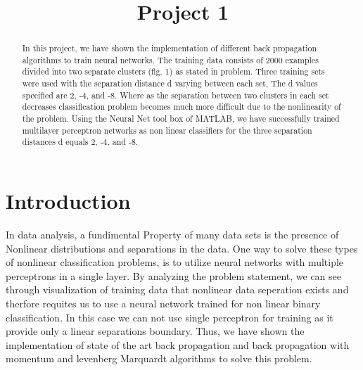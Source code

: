\documentclass[conference]{IEEEtran}
\begin{document}
\title{Project 1}
\normalsize
\author{
	\and
{}
\and	
{}
	
	
}


\maketitle


\begin{abstract}
 In this project, we have shown the implementation of  different back propagation algorithms to train neural networks. The training data consists of 2000 examples divided into two separate clusters (fig. 1) as stated in problem. Three training sets were used with the separation distance d varying between each set, The d values specified are 2, -4, and -8. Where as the separation between two clusters in each set decreases classification problem becomes much more difficult due to the nonlinearity of the problem. Using the Neural Net tool box of MATLAB, we have successfully trained multilayer perceptron networks as non linear classifiers for the three separation distances d equals 2, -4, and -8.
\end{abstract}


\section{Introduction}

In data analysis, a fundimental Property of many data sets is the presence of Nonlinear distributions and separations in the data. One way to solve these types of nonlinear classification problems\cite{ol}, is to utilize neural networks with multiple perceptrons in a single layer. By analyzing the problem statement, we can see through visualization of training data that nonlinear data seperation exists and therfore requites us to use a neural network trained for non linear binary classification. In this case we can not use single perceptron for training as it provide only a linear separations boundary. Thus, we have shown the implementation of state of the art back propagation and back propagation with momentum and levenberg Marquardt algorithms to solve this problem.
\end{document}
